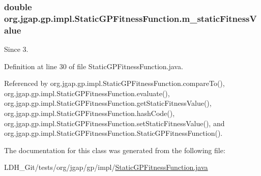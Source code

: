 \hypertarget{classorg_1_1jgap_1_1gp_1_1impl_1_1_static_g_p_fitness_function_ac455980ae334ece2d52c66652ffce165}{
\subsubsection[{m\-\_\-static\-Fitness\-Value}]{\setlength{\rightskip}{0pt plus 5cm}double org.\-jgap.\-gp.\-impl.\-Static\-G\-P\-Fitness\-Function.\-m\-\_\-static\-Fitness\-Value\hspace{0.3cm}{\ttfamily [private]}}}\label{classorg_1_1jgap_1_1gp_1_1impl_1_1_static_g_p_fitness_function_ac455980ae334ece2d52c66652ffce165}
\begin{DoxySince}{Since}
3. 
\end{DoxySince}


Definition at line 30 of file Static\-G\-P\-Fitness\-Function.\-java.



Referenced by org.\-jgap.\-gp.\-impl.\-Static\-G\-P\-Fitness\-Function.\-compare\-To(), org.\-jgap.\-gp.\-impl.\-Static\-G\-P\-Fitness\-Function.\-evaluate(), org.\-jgap.\-gp.\-impl.\-Static\-G\-P\-Fitness\-Function.\-get\-Static\-Fitness\-Value(), org.\-jgap.\-gp.\-impl.\-Static\-G\-P\-Fitness\-Function.\-hash\-Code(), org.\-jgap.\-gp.\-impl.\-Static\-G\-P\-Fitness\-Function.\-set\-Static\-Fitness\-Value(), and org.\-jgap.\-gp.\-impl.\-Static\-G\-P\-Fitness\-Function.\-Static\-G\-P\-Fitness\-Function().



The documentation for this class was generated from the following file\-:\begin{DoxyCompactItemize}
\item 
L\-D\-H\-\_\-\-Git/tests/org/jgap/gp/impl/\hyperlink{_static_g_p_fitness_function_8java}{Static\-G\-P\-Fitness\-Function.\-java}\end{DoxyCompactItemize}
